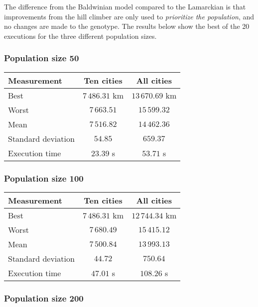 \documentclass{article}
\begin{document}
The difference from the Baldwinian model compared to the Lamarckian is that improvements from the hill climber are only used to \textit{prioritize the population}, and no changes are made to the genotype. The results below show the best of the 20 executions for the three different population sizes.

\subsubsection*{Population size 50}

\begin{center}
\begin{tabular}{lcc}
\toprule
Measurement & Ten cities & All cities \\
\midrule
Best & $7\,486.31$ km & $13\,670.69$ km \\
Worst & $7\,663.51$ & $15\,599.32$ \\
Mean & $7\,516.82$ & $14\,462.36$ \\
Standard deviation & $54.85$ & $659.37$ \\
Execution time & $23.39$ s & $53.71$ s \\
\bottomrule
\end{tabular}
\end{center}

\subsubsection*{Population size 100}

\begin{center}
\begin{tabular}{lcc}
\toprule
Measurement & Ten cities & All cities \\
\midrule
Best & $7\,486.31$ km & $12\,744.34$ km \\
Worst & $7\,680.49$ & $15\,415.12$ \\
Mean & $7\,500.84$ & $13\,993.13$ \\
Standard deviation & $44.72$ & $750.64$ \\
Execution time & $47.01$ s & $108.26$ s \\
\bottomrule
\end{tabular}
\end{center}

\subsubsection*{Population size 200}
\end{document}

